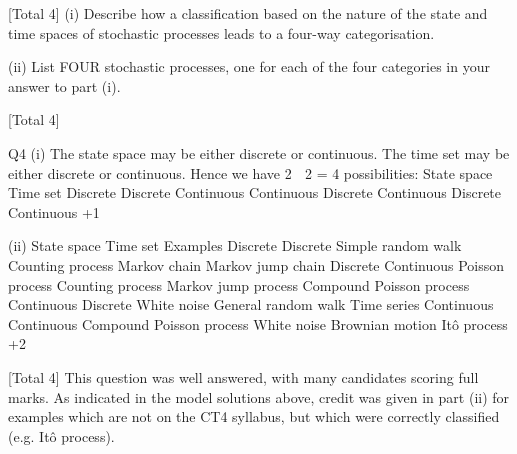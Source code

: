 \documentclass[a4paper,12pt]{article}
\begin{document}
[Total 4]
(i) Describe how a classification based on the nature of the state and time spaces
of stochastic processes leads to a four-way categorisation.

(ii) List FOUR stochastic processes, one for each of the four categories in your
answer to part (i).

[Total 4]

Q4
(i)
The state space may be either discrete or continuous. 
The time set may be either discrete or continuous. 
Hence we have 2  2 = 4 possibilities:
State space Time set
Discrete
Discrete
Continuous
Continuous Discrete
Continuous
Discrete
Continuous
+1

(ii)
State space Time set Examples
Discrete Discrete Simple random walk
Counting process
Markov chain
Markov jump chain
Discrete Continuous Poisson process
Counting process
Markov jump process
Compound Poisson
process
Continuous Discrete White noise
General random walk
Time series
Continuous Continuous Compound Poisson
process
White noise
Brownian motion
Itô process
+2

[Total 4]
This question was well answered, with many candidates scoring full marks.
As indicated in the model solutions above, credit was given in part (ii) for
examples which are not on the CT4 syllabus, but which were correctly
classified (e.g. Itô process).
\end{document}
